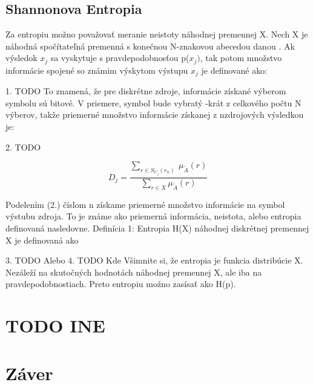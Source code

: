 \subsection{Shannonova Entropia}
Za entropiu možno považovať meranie neistoty náhodnej premennej X. Nech X je náhodná spočítateľná premenná s konečnou N-znakovou abecedou danou   .
Ak výsledok $x_j$ sa vyskytuje s pravdepodobnosťou p($x_j)$, tak potom množstvo informácie spojené so známim výskytom výstupu $x_j$ je definované ako:

1. TODO
To znamená, že pre diskrétne zdroje, informácie získané výberom symbolu sú bitové. V priemere, symbol  bude vybratý -krát z celkového počtu N výberov, takže priemerné množstvo informácie získanej z nzdrojových výsledkou je:

2. TODO 

\begin{equation}\label{fuzzy}
D_j = \frac{ \sum\limits_{r \in S_{C_{j}}(r_n)  } \: \mu_{\tilde{A}} (r) }{\sum\limits_{r \in X  } \mu_{\tilde{A}} (r) }
\end{equation}




Podelením (2.) číslom n získame priemerné množstvo informácie na symbol výstubu zdroja. To je známe ako priemerná informácia, neistota, alebo entropia definovaná nasledovne.
Definícia 1:  Entropia H(X) náhodnej diskrétnej premennej X je definovaná ako 

3. TODO
Alebo
4.	TODO
Kde
Všimnite si, že entropia je funkcia distribúcie X. Nezáleží na skutočných hodnotách náhodnej premennej X, ale iba na pravdepodobnostiach. Preto entropiu možno zasísať ako H(p).


\section{TODO INE }

\section{Záver}
